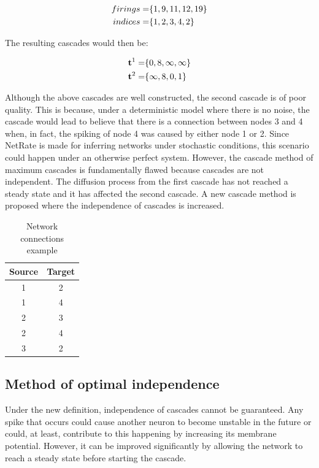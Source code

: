 \begin{align}
	\centering
	firings = &\{1, 9, 11, 12, 19\}\\
	indices = &\{1, 2,  3,  4, 2\}
	\label{eq:quality_cascades}
\end{align}

The resulting cascades would then be:

\begin{align}
	\centering
	\textbf{t}^{1} = &\{0, 8, \infty, \infty \}\\
	\textbf{t}^{2} = &\{\infty, 8, 0, 1 \}
\end{align}

Although the above cascades are well constructed, the second cascade is of poor quality. This is because, under a deterministic model where there is no noise, the cascade would lead to believe that there is a connection between nodes 3 and 4 when, in fact, the spiking of node 4 was caused by either node 1 or 2. Since NetRate is made for inferring networks under stochastic conditions, this scenario could happen under an otherwise perfect system. However, the cascade method of maximum cascades is fundamentally flawed because cascades are not independent. The diffusion process from the first cascade has not reached a steady state and it has affected the second cascade. A new cascade method is proposed where the independence of cascades is increased. 

\begin{table}[H]
\centering
\begin{tabular}{|c|c|}
\hline
Source & Target \\ \hline
1      & 2      \\ \hline
1      & 4      \\ \hline
2      & 3      \\ \hline
2      & 4      \\ \hline
3      & 2      \\ \hline
\end{tabular}
\caption{Network connections example}
\label{tab:quality_cascades}
\end{table}


\subsection{Method of optimal independence}

Under the new definition, independence of cascades cannot be guaranteed. Any spike that occurs could cause another neuron to become unstable in the future or could, at least, contribute to this happening by increasing its membrane potential. However, it can be improved significantly by allowing the network to reach a steady state before starting the cascade.\\

